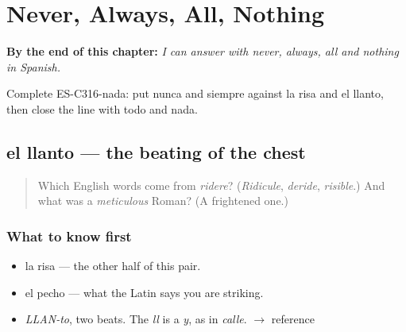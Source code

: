 
\chapter{Never, Always, All, Nothing}
\label{ch:nunca-y-siempre}

\begin{chapteropening}
\textbf{By the end of this chapter:} \emph{I can answer with never, always, all and nothing in Spanish.}

Complete ES-C316-nada: put nunca and siempre against la risa and el llanto, then close the line with todo and nada.
\end{chapteropening}

\section[el llanto]{el llanto — the beating of the chest}

\label{lesson:ES-C316-llanto}



\begin{quote}
Which English words come from \emph{ridere}? (\emph{Ridicule}, \emph{deride}, \emph{risible}.) And what was a \emph{meticulous} Roman? (A frightened one.)
\end{quote}

\subsection*{What to know first}
\begin{itemize}
\raggedright
  \item la risa — the other half of this pair.
  \item el pecho — what the Latin says you are striking.
\end{itemize}

\begin{sounds}
\begin{itemize}
\raggedright
  \item \emph{LLAN-to}, two beats. The \emph{ll} is a \emph{y}, as in \emph{calle}. $\to$ reference
\end{itemize}
\end{sounds}

